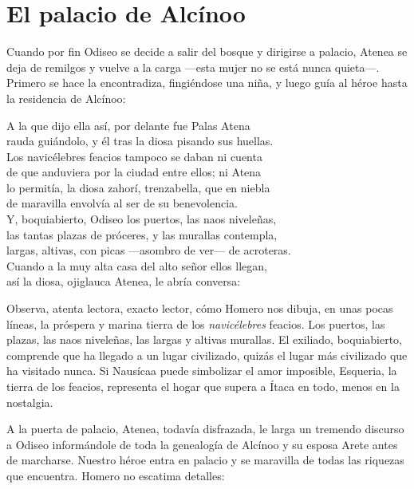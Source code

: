 \label{cap:esqueria}

\section*{El palacio de Alcínoo}

Cuando por fin Odiseo se decide a salir del bosque y dirigirse a palacio, Atenea se deja de remilgos y vuelve a la carga ---esta mujer no se está nunca quieta---. Primero se hace la encontradiza, fingiéndose una niña, y luego guía al héroe hasta la residencia de Alcínoo:

\begin{versocita}
A la que dijo ella así, por delante fue Palas Atena\\
rauda guiándolo, y él tras la diosa pisando sus huellas.\\
Los navicélebres feacios tampoco se daban ni cuenta\\
de que anduviera por la ciudad entre ellos; ni Atena\\
lo permitía, la diosa zahorí, trenzabella, que en niebla\\
de maravilla envolvía al ser de su benevolencia.\\
Y, boquiabierto, Odiseo los puertos, las naos niveleñas,\\
las tantas plazas de próceres, y las murallas contempla,\\
largas, altivas, con picas ---asombro de ver--- de acroteras.\\
Cuando a la muy alta casa del alto señor ellos llegan,\\
así la diosa, ojiglauca Atenea, le abría conversa:
\end{versocita}

Observa, atenta lectora, exacto lector, cómo Homero nos dibuja, en unas pocas líneas, la próspera y marina tierra de los \emph{navicélebres} feacios. Los puertos, las plazas, las naos niveleñas, las largas y altivas murallas. El exiliado, boquiabierto, comprende que ha llegado a un lugar civilizado, quizás el lugar más civilizado que ha visitado nunca. Si Nausícaa puede simbolizar el amor imposible, Esqueria, la tierra de los feacios, representa el hogar que supera a Ítaca en todo, menos en la nostalgia.

A la puerta de palacio, Atenea, todavía disfrazada, le larga un tremendo discurso a Odiseo informándole de toda la genealogía de Alcínoo y su esposa Arete antes de marcharse. Nuestro héroe entra en palacio y se maravilla de todas las riquezas que encuentra. Homero no escatima detalles:


